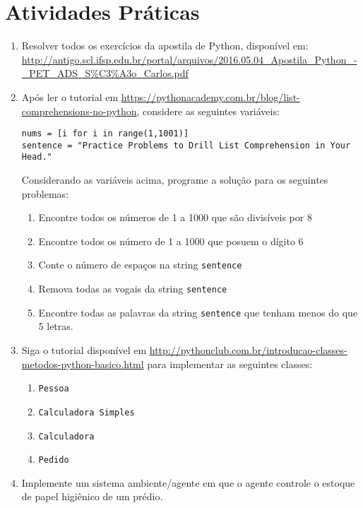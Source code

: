 \documentclass{article}
\begin{document}
\section{Atividades Práticas}

\begin{enumerate}
    \item Resolver todos os exercícios da apostila de Python, disponível em: \url{http://antigo.scl.ifsp.edu.br/portal/arquivos/2016.05.04_Apostila\_Python\_-\_PET\_ADS\_S\%C3\%A3o_Carlos.pdf}
    \item Após ler o tutorial em \url{https://pythonacademy.com.br/blog/list-comprehensions-no-python}, considere as seguintes variáveis:
    
    \texttt{nums = [i for i in range(1,1001)]}\\
    \texttt{sentence = "Practice Problems to Drill List Comprehension in Your Head."}
    
    Considerando as variáveis acima, programe a solução para os seguintes problemas:
    
    \begin{enumerate}
    \item Encontre todos os números de 1 a 1000 que são divisíveis por 8
    \item Encontre todos os número de 1 a 1000 que posuem o dígito 6
    \item Conte o número de espaços na string \texttt{sentence}
    \item Remova todas as vogais da string \texttt{sentence}
    \item Encontre todas as palavras da string \texttt{sentence} que tenham menos do que 5 letras.
    \end{enumerate}
    
    \item Siga o tutorial disponível em \url{http://pythonclub.com.br/introducao-classes-metodos-python-basico.html} para implementar as seguintes classes:
    \begin{enumerate}
        \item \texttt{Pessoa}
        \item \texttt{Calculadora Simples}
        \item \texttt{Calculadora}
        \item \texttt{Pedido}
    \end{enumerate}
    
    \item Implemente um sistema ambiente/agente em que o agente controle o estoque de papel higiênico de um prédio.

\end{enumerate}

%
%
\end{document}
